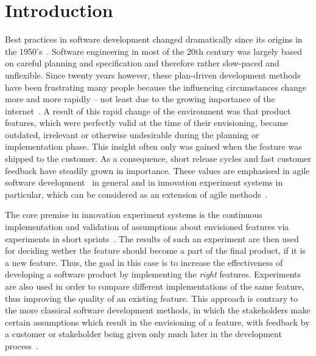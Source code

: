 %
\chapter{Introduction}
\label{sec:intro}

Best practices in software development changed dramatically since its origins in the 1950's~\cite{boehm2006view}.
Software engineering in most of the 20th century was largely based on careful planning and specification and therefore rather slow-paced and unflexible.
Since twenty years however, these plan-driven development methods have been frustrating many people because the influencing circumstances change more and more rapidly -- not least due to the growing importance of the internet~\cite{Williams2003}.
A result of this rapid change of the environment was that product features, which were perfectly valid at the time of their envisioning, became outdated, irrelevant or otherwise undesirable during the planning or implementation phase.
This insight often only was gained when the feature was shipped to the customer.
As a consequence, short release cycles and fast customer feedback have steadily grown in importance.
These values are emphasised in agile software development~\cite{fowler2001agile} in general and in innovation experiment systems in particular, which can be considered as an extension of agile methods~\cite{Bosch2012}.

The core premise in innovation experiment systems is the continuous implementation and validation of assumptions about envisioned features via experiments in short sprints~\cite{Bosch2012}.
The results of such an experiment are then used for deciding wether the feature should become a part of the final product, if it is a new feature.
Thus, the goal in this case is to increase the effectiveness of developing a software product by implementing the \emph{right} features.
Experiments are also used in order to compare different implementations of the same feature, thus improving the quality of an existing feature.
This approach is contrary to the more classical software development methods, in which the stakeholders make certain assumptions which result in the envisioning of a feature, with feedback by a customer or stakeholder being given only much later in the development process~\cite{Bosch2012}.

